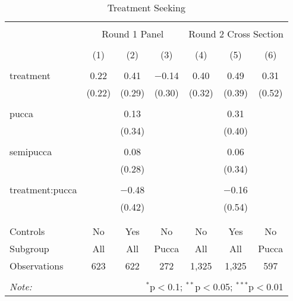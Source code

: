 
\begin{table}[!htbp] \centering 
  \caption{Treatment Seeking} 
  \label{tbl:Treatment Seeking} 
\begin{tabular}{@{\extracolsep{5pt}}lcccccc} 
\\[-1.8ex]\hline 
\hline \\[-1.8ex] 
 & \multicolumn{3}{c}{Round 1 Panel} & \multicolumn{3}{c}{Round 2 Cross Section} \\ 
\\[-1.8ex] & (1) & (2) & (3) & (4) & (5) & (6)\\ 
\hline \\[-1.8ex] 
 treatment & 0.22 & 0.41 & $-$0.14 & 0.40 & 0.49 & 0.31 \\ 
  & (0.22) & (0.29) & (0.30) & (0.32) & (0.39) & (0.52) \\ 
  & & & & & & \\ 
 pucca &  & 0.13 &  &  & 0.31 &  \\ 
  &  & (0.34) &  &  & (0.40) &  \\ 
  & & & & & & \\ 
 semipucca &  & 0.08 &  &  & 0.06 &  \\ 
  &  & (0.28) &  &  & (0.34) &  \\ 
  & & & & & & \\ 
 treatment:pucca &  & $-$0.48 &  &  & $-$0.16 &  \\ 
  &  & (0.42) &  &  & (0.54) &  \\ 
  & & & & & & \\ 
\hline \\[-1.8ex] 
Controls & No & Yes & No & No & Yes & No \\ 
Subgroup & All & All & Pucca & All & All & Pucca \\ 
Observations & 623 & 622 & 272 & 1,325 & 1,325 & 597 \\ 
\hline 
\hline \\[-1.8ex] 
\textit{Note:}  & \multicolumn{6}{r}{$^{*}$p$<$0.1; $^{**}$p$<$0.05; $^{***}$p$<$0.01} \\ 
\end{tabular} 
\end{table} 
